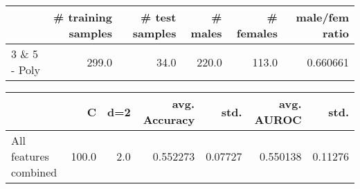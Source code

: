\begin{tabular}{lrrrrr}
\hline
{} &  \# training samples &  \# test samples &  \# males &  \# females &  male/fem ratio \\
\hline
3 \& 5 - Poly &               299.0 &            34.0 &    220.0 &      113.0 &        0.660661 \\
\hline
\end{tabular}
\begin{tabular}{lrrrrrr}
\hline
{} &      C &  d=2 &  avg. Accuracy &     std. &  avg. AUROC &     std. \\
\hline
All features combined &  100.0 &  2.0 &       0.552273 &  0.07727 &    0.550138 &  0.11276 \\
\hline
\end{tabular}
